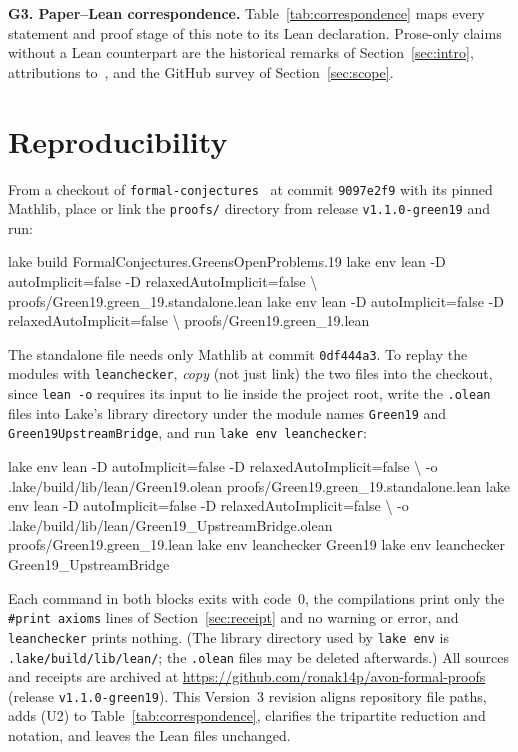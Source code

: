 \documentclass[11pt,reqno]{amsart}
\theoremstyle{remark}
\newcommand{\LeanUS}{\textunderscore\hspace{0pt}}
\newcommand{\lean}[1]{{\let\_\LeanUS\texttt{#1}}}
\begin{document}
\medskip
\noindent\textbf{G3. Paper--Lean correspondence.} Table~\ref{tab:correspondence} maps every statement and proof stage of this note to its Lean declaration. Prose-only claims without a Lean counterpart are the historical remarks of Section~\ref{sec:intro}, attributions to~\cite{Mandache,FSSSZ,Chu,Behrend,RS}, and the GitHub survey of Section~\ref{sec:scope}.

\section{Reproducibility}\label{sec:repro}

From a checkout of \lean{formal-conjectures}~\cite{FC} at commit \lean{9097e2f9} with its pinned Mathlib, place or link the \lean{proofs/\allowbreak{}} directory from release \lean{v1.1.0-green19} and run:

\begin{leancode}
lake build FormalConjectures.GreensOpenProblems.\guillemotleft{}19\guillemotright{}
lake env lean -D autoImplicit=false -D relaxedAutoImplicit=false \textbackslash
  proofs/Green19.green_19.standalone.lean
lake env lean -D autoImplicit=false -D relaxedAutoImplicit=false \textbackslash
  proofs/Green19.green_19.lean
\end{leancode}

The standalone file needs only Mathlib at commit \lean{0df444a3}. To replay the modules with \lean{leanchecker}, \emph{copy} (not just link) the two files into the checkout, since \lean{lean -o} requires its input to lie inside the project root, write the \lean{.olean} files into Lake's library directory under the module names \lean{Green19} and \lean{Green19\_UpstreamBridge}, and run \lean{lake env leanchecker}:

\begin{leancode}
lake env lean -D autoImplicit=false -D relaxedAutoImplicit=false \textbackslash
  -o .lake/build/lib/lean/Green19.olean proofs/Green19.green_19.standalone.lean
lake env lean -D autoImplicit=false -D relaxedAutoImplicit=false \textbackslash
  -o .lake/build/lib/lean/Green19_UpstreamBridge.olean proofs/Green19.green_19.lean
lake env leanchecker Green19
lake env leanchecker Green19_UpstreamBridge
\end{leancode}

Each command in both blocks exits with code~0, the compilations print only the \lean{\#print axioms} lines of Section~\ref{sec:receipt} and no warning or error, and \lean{leanchecker} prints nothing. (The library directory used by \lean{lake env} is \lean{.lake/\allowbreak{}build/\allowbreak{}lib/\allowbreak{}lean/\allowbreak{}}; the \lean{.olean} files may be deleted afterwards.) All sources and receipts are archived at \url{https://github.com/ronak14p/avon-formal-proofs} (release \lean{v1.1.0-green19}). This Version~3 revision aligns repository file paths, adds (U2) to Table~\ref{tab:correspondence}, clarifies the tripartite reduction and notation, and leaves the Lean files unchanged.
\end{document}
